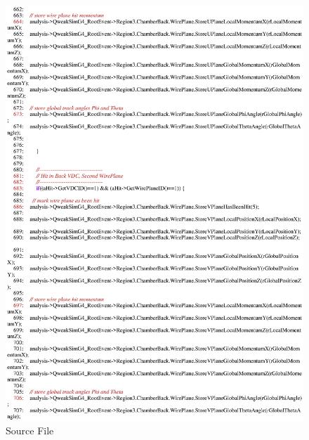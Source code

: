 \begin{figure}[h]
  \hspace{0cm}
  \includegraphics[scale=0.8]{./figures13/QweakSimEventAction.cc-p12.eps}
  \caption{Source File}
           \label{fig:XIII-SC-27}
\end{figure}

\clearpage

